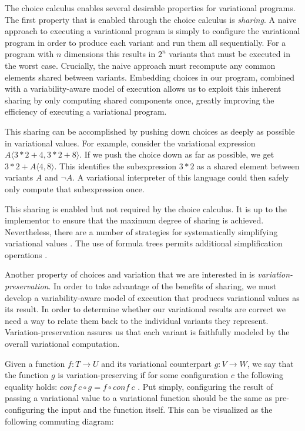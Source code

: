 \documentclass[12pt,oneside]{book}
\newcommand{\tagtree}[3]{#1 \langle #2, #3 \rangle}
\begin{document}
The choice calculus enables several desirable properties for variational programs.
The first property that is enabled through the choice calculus is \emph{sharing}. A naive approach to executing a variational program is simply to
configure the variational program in order to produce each variant and run them all sequentially.
For a program with $n$ dimensions this results in $2^n$ variants that must be executed in the worst case. Crucially,
the naive approach must recompute any common elements shared between variants. Embedding
choices in our program, combined with a variability-aware model of execution allows us to exploit this
inherent sharing by only computing shared components once, greatly improving the efficiency of
executing a variational program.

This sharing can be accomplished by pushing down choices as deeply as possible in variational
values. For example, consider the variational expression $\tagtree{A}{3*2+4}{3*2+8}$. If we push
the choice down as far as possible, we get $3*2+\tagtree{A}{4}{8}$. This identifies the subexpression
$3*2$ as a shared element between variants $A$ and $\neg A$. A variational interpreter of this
language could then safely only compute that subexpression once.

This sharing is enabled but not required by the choice calculus. It is up to the implementor to
ensure that the maximum degree of sharing is achieved. Nevertheless, there are a number of
strategies for systematically simplifying variational values \cite{Walk13thesis}. The use of formula
trees permits additional simplification operations \cite{HW16fosd,WO14gpce}.

Another property of choices and variation that we are interested in is \emph{variation-preservation}. In order
to take advantage of the benefits of sharing, we must develop a variability-aware model of execution
that produces variational values as its result. In order to determine whether our variational results
are correct we need a way to relate them back to the individual variants they represent.
Variation-preservation assures us that each variant is faithfully modeled by the overall variational computation.

Given a function $f : T \rightarrow U$ and its variational counterpart $g : V \rightarrow W$, we say that
the function $g$ is variation-preserving if for some configuration $c$ the following equality holds:
$\mathit{conf}\ c \circ g = f \circ \mathit{conf}\ c$ \cite{HW16fosd}. Put simply, configuring the result
of passing a variational value to a variational function should be the same as pre-configuring the input
and the function itself. This can be visualized as the following commuting diagram:
\end{document}
